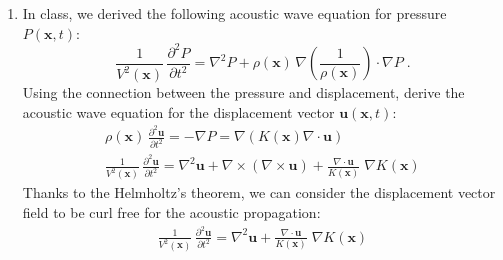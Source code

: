 \begin{enumerate}
\item In class, we derived the following acoustic wave equation for
  pressure $P(\mathbf{x},t)$:
\begin{equation}
{\frac{1}{V^2(\mathbf{x})}}\,{\frac{\partial^2 P}{\partial t^2}} =\nabla^2 P + 
\rho(\mathbf{x})\,
\nabla\left(\frac{1}{\rho(\mathbf{x})}\right) \cdot \nabla P\;.
\label{eq:pwave}
\end{equation}
Using the connection between the pressure and displacement, derive the
acoustic wave equation for the displacement vector
$\mathbf{u}(\mathbf{x},t)$:
\begin{eqnarray}
  \label{eq:uwave}
  \rho(\mathbf{x})\,\frac{\partial^2 \mathbf{u}}{\partial t^2} = - \nabla P = \nabla \left(K(\mathbf{x})\nabla \cdot \mathbf{u}\right)\\
{\frac{1}{V^2(\mathbf{x})}}\,{\frac{\partial^2 \mathbf{u}}{\partial t^2}} = 
\nabla^2 \mathbf{u} + \nabla\times(\nabla\times\mathbf{u}) + 
\frac{\nabla\cdot\mathbf{u}}{K(\mathbf{x})}\; \nabla K(\mathbf{x})
\end{eqnarray}
Thanks to the Helmholtz's theorem, we can consider the displacement vector field to be curl free for the acoustic propagation:
\begin{eqnarray}
{\frac{1}{V^2(\mathbf{x})}}\,{\frac{\partial^2 \mathbf{u}}{\partial t^2}} = 
\nabla^2 \mathbf{u} + \frac{\nabla\cdot\mathbf{u}}{K(\mathbf{x})}\; \nabla K(\mathbf{x})
\end{eqnarray}


\end{enumerate}
